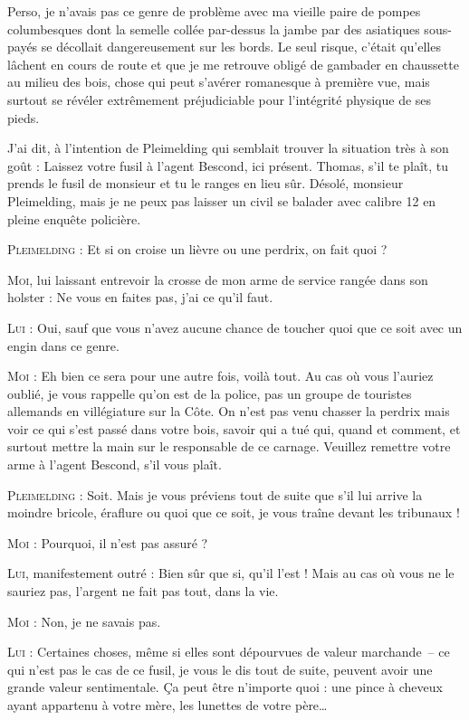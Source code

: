 Perso, je n’avais pas ce genre de problème avec ma vieille paire de pompes columbesques dont la semelle collée par-dessus la jambe par des asiatiques sous-payés se décollait dangereusement sur les bords. Le seul risque, c’était qu’elles lâchent en cours de route et que je me retrouve obligé de gambader en chaussette au milieu des bois, chose qui peut s’avérer romanesque à première vue, mais surtout se révéler extrêmement préjudiciable pour l’intégrité physique de ses pieds.

\begin{dialogue}

J’ai dit, à l’intention de Pleimelding qui semblait trouver la situation très à son goût : Laissez votre fusil à l’agent Bescond, ici présent. Thomas, s’il te plaît, tu prends le fusil de monsieur et tu le ranges en lieu sûr. Désolé, monsieur Pleimelding, mais je ne peux pas laisser un civil se balader avec calibre 12 en pleine enquête policière.

\textsc{Pleimelding} : Et si on croise un lièvre ou une perdrix, on fait quoi ?

\textsc{Moi}, lui laissant entrevoir la crosse de mon arme de service rangée dans son holster : Ne vous en faites pas, j’ai ce qu’il faut.

\textsc{Lui} : Oui, sauf que vous n’avez aucune chance de toucher quoi que ce soit avec un engin dans ce genre.

\textsc{Moi} : Eh bien ce sera pour une autre fois, voilà tout. Au cas où vous l’auriez oublié, je vous rappelle qu’on est de la police, pas un groupe de touristes allemands en villégiature sur la Côte. On n’est pas venu chasser la perdrix mais voir ce qui s’est passé dans votre bois, savoir qui a tué qui, quand et comment, et surtout mettre la main sur le responsable de ce carnage. Veuillez remettre votre arme à l’agent Bescond, s’il vous plaît.

\textsc{Pleimelding} : Soit. Mais je vous préviens tout de suite que s’il lui arrive la moindre bricole, éraflure ou quoi que ce soit, je vous traîne devant les tribunaux !

\textsc{Moi} : Pourquoi, il n’est pas assuré ?

\textsc{Lui}, manifestement outré : Bien sûr que si, qu’il l’est ! Mais au cas où vous ne le sauriez pas, l’argent ne fait pas tout, dans la vie.

\textsc{Moi} : Non, je ne savais pas.

\textsc{Lui} : Certaines choses, même si elles sont dépourvues de valeur marchande~-- ce qui n’est pas le cas de ce fusil, je vous le dis tout de suite, peuvent avoir une grande valeur sentimentale. Ça peut être n’importe quoi : une pince à cheveux ayant appartenu à votre mère, les lunettes de votre père…


\end{dialogue}
